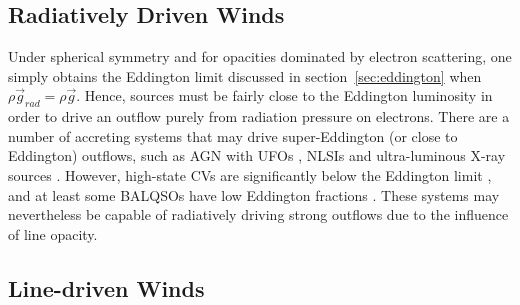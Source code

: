 \subsection{Radiatively Driven Winds}
\label{sec:rad_winds}

Under spherical symmetry and for opacities dominated by electron scattering, 
one simply obtains the Eddington limit discussed
in section~\ref{sec:eddington} when $\rho \vec{g}_{rad} = \rho \vec{g}$. 
Hence, sources must be fairly close to the Eddington luminosity in order 
to drive an outflow purely from radiation 
pressure on electrons. There are a number of accreting systems that may drive
super-Eddington (or close to Eddington) outflows, 
such as AGN with UFOs \citep[e.g.][]{reeves2002,pounds2016},
NLSIs \citep{done2015} and ultra-luminous X-ray sources \citep[ULXs;][]{walton2013}.
However, high-state CVs are significantly below the Eddington limit 
\citep{warnerbook}, and at least some BALQSOs have low Eddington fractions 
\citep[$\sim25\%$ have $L/L_{\mathrm{Edd}}<0.1$;][]{grupenousek2015}.
These systems may nevertheless be capable of radiatively driving strong 
outflows due to the influence of line opacity.

\subsection{Line-driven Winds}

\label{sec:line_driving}

